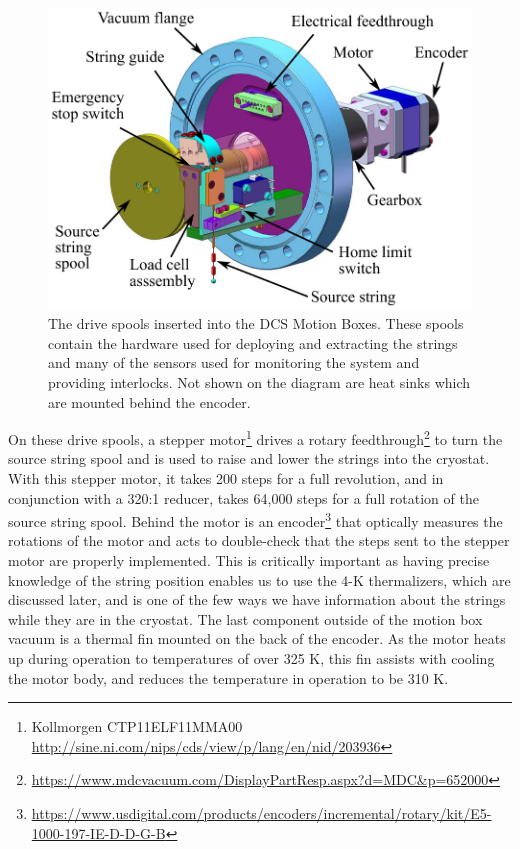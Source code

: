 \begin{figure}
    \centering
    \includegraphics[width=0.8\linewidth]{Figures/drive_spool.pdf}
    \caption[The drive spools inserted into the DCS Motion Boxes.]
    {The drive spools inserted into the DCS Motion Boxes.
    These spools contain the hardware used for deploying and extracting the strings and many of the sensors used for monitoring the system and providing interlocks.
    Not shown on the diagram are heat sinks which are mounted behind the encoder.}
    \label{fig:drive_spool}
\end{figure}
On these drive spools, a stepper motor\footnote{Kollmorgen CTP11ELF11MMA00 \url{http://sine.ni.com/nips/cds/view/p/lang/en/nid/203936}} drives a rotary feedthrough\footnote{\url{https://www.mdcvacuum.com/DisplayPartResp.aspx?d=MDC&p=652000}} to turn the source string spool and is used to raise and lower the strings into the cryostat.
With this stepper motor, it takes 200 steps for a full revolution, and in conjunction with a 320:1 reducer, takes 64,000 steps for a full rotation of the source string spool.
Behind the motor is an encoder\footnote{\RaggedRight\url{https://www.usdigital.com/products/encoders/incremental/rotary/kit/E5-1000-197-IE-D-D-G-B}} that optically measures the rotations of the motor and acts to double-check that the steps sent to the stepper motor are properly implemented.
This is critically important as having precise knowledge of the string position enables us to use the 4-K thermalizers, which are discussed later, and is one of the few ways we have information about the strings while they are in the cryostat.
The last component outside of the motion box vacuum is a thermal fin mounted on the back of the encoder.
As the motor heats up during operation to temperatures of over 325 K, this fin assists with cooling the motor body, and reduces the temperature in operation to be 310 K.
